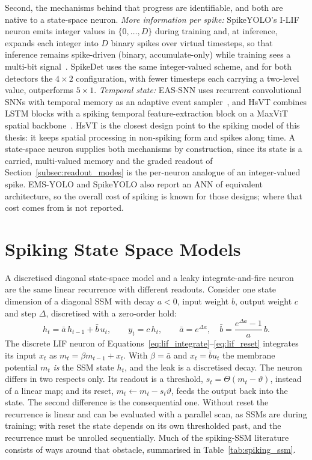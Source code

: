 \documentclass[11pt, a4paper]{report}
\begin{document}
Second, the mechanisms behind that progress are identifiable, and both are native to a state-space neuron.
\emph{More information per spike:} SpikeYOLO's I-LIF neuron emits integer values in $\{0,\dots,D\}$ during
training and, at inference, expands each integer into $D$ binary spikes over virtual timesteps, so that
inference remains spike-driven (binary, accumulate-only) while training sees a multi-bit
signal~\cite{luo2024integer}. SpikeDet uses the same integer-valued scheme, and for both detectors the
$4\times2$ configuration, with fewer timesteps each carrying a two-level value, outperforms $5\times1$. \emph{Temporal state:}
EAS-SNN uses recurrent convolutional SNNs with temporal memory as an adaptive event sampler~\cite{wang2024eas},
and HsVT combines LSTM blocks with a spiking temporal feature-extraction block on a MaxViT spatial
backbone~\cite{xu2025hybrid}. HsVT is the closest design point to the spiking model of this thesis: it keeps
spatial processing in non-spiking form and spikes along time. A state-space neuron supplies both mechanisms
by construction, since its state is a carried, multi-valued memory and the graded readout of
Section~\ref{subsec:readout_modes} is the per-neuron analogue of an integer-valued spike. EMS-YOLO and
SpikeYOLO also report an ANN of equivalent architecture, so the overall cost of spiking is known for those
designs; where that cost comes from is not reported.

\section{Spiking State Space Models}
\label{sec:spiking_ssm}
A discretised diagonal state-space model and a leaky integrate-and-fire neuron are the same linear
recurrence with different readouts. Consider one state dimension of a diagonal SSM with decay $a<0$,
input weight $b$, output weight $c$ and step $\Delta$, discretised with a zero-order hold:
\begin{equation}
  h_t = \bar a\, h_{t-1} + \bar b\, u_t, \qquad y_t = c\, h_t, \qquad
  \bar a = e^{\Delta a}, \quad \bar b = \frac{e^{\Delta a}-1}{a}\, b .
  \label{eq:ssm_scalar}
\end{equation}
The discrete LIF neuron of Equations~\eqref{eq:lif_integrate}--\eqref{eq:lif_reset} integrates its input
$x_t$ as $m_t = \beta m_{t-1} + x_t$. With $\beta = \bar a$ and $x_t = \bar b u_t$ the membrane potential
$m_t$ \emph{is} the SSM state $h_t$, and the leak is a discretised decay. The neuron differs in two
respects only. Its readout is a threshold, $s_t = \Theta(m_t - \vartheta)$, instead of a linear map; and its
reset, $m_t \leftarrow m_t - s_t\vartheta$, feeds the output back into the state. The second difference is
the consequential one. Without reset the recurrence is linear and can be evaluated with a parallel scan, as
SSMs are during training; with reset the state depends on its own thresholded past, and the recurrence must
be unrolled sequentially. Much of the spiking-SSM literature consists of ways around that obstacle,
summarised in Table~\ref{tab:spiking_ssm}.
\end{document}

